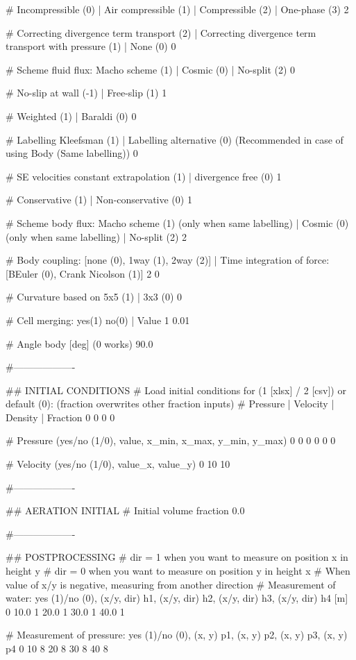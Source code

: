 # Incompressible (0)	| Air compressible (1)	| Compressible (2) | One-phase (3)
2

# Correcting divergence term transport (2) | Correcting divergence term transport with pressure (1) | None (0)
0

# Scheme fluid flux: Macho scheme (1)	|  Cosmic (0) | No-split (2)
0

# No-slip at wall (-1)	| Free-slip (1)
1

# Weighted (1) | Baraldi (0)
0

# Labelling Kleefsman (1) | Labelling alternative (0) (Recommended in case of using Body (Same labelling))
0

# SE velocities constant extrapolation (1) | divergence free (0)
1

# Conservative (1) | Non-conservative (0)
1

# Scheme body flux: Macho scheme (1) (only when same labelling) | Cosmic (0) (only when same labelling) | No-split (2)
2

# Body coupling: [none (0), 1way (1), 2way (2)] | Time integration of force: [BEuler (0), Crank Nicolson (1)]
2 0

# Curvature based on 5x5 (1) | 3x3 (0)
0

# Cell merging: yes(1) no(0) | Value
1 0.01

# Angle body [deg] (0 works)
90.0

#-------------------

## INITIAL CONDITIONS
# Load initial conditions for (1 [xlsx] / 2 [csv]) or default (0): (fraction overwrites other fraction inputs)
# Pressure 		| Velocity		| Density		| Fraction
0   0   0   0

# Pressure (yes/no (1/0), value, x_min, x_max, y_min, y_max)
0 0 0 0 0 0

# Velocity (yes/no (1/0), value_x, value_y)
0 10 10

#-------------------

## AERATION INITIAL
# Initial volume fraction
0.0

#-------------------

## POSTPROCESSING
# dir = 1 when you want to measure on position x in height y
# dir = 0 when you want to measure on position y in height x
# When value of x/y is negative, measuring from another direction
# Measurement of water: yes (1)/no (0), (x/y, dir) h1, (x/y, dir) h2, (x/y, dir) h3, (x/y, dir) h4 [m]
0   10.0 1  20.0 1  30.0 1  40.0 1

# Measurement of pressure: yes (1)/no (0), (x, y) p1, (x, y) p2, (x, y) p3, (x, y) p4
0	10 8	20 8     30 8	40 8

